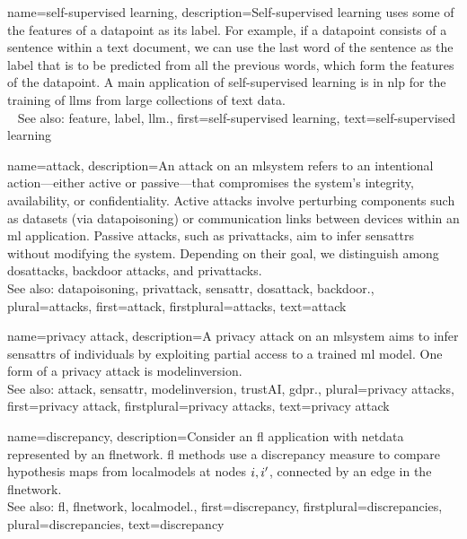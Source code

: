 {name={self-supervised learning},
 	description={Self-supervised learning uses some of 
  		the \glspl{feature} of a \gls{datapoint} as its \gls{label}. For 
		example, if a \gls{datapoint} consists of a sentence within a text document, 
		we can use the last word of the sentence as the \gls{label} that is 
		to be predicted from all the previous words, which form the \glspl{feature} 
		of the \gls{datapoint}. A main application of self-supervised learning 
		is in \gls{nlp} for the \gls{training} of \glspl{llm} from large collections 
		of text \gls{data}. 
		\\ 
      		See also: \gls{feature}, \gls{label}, \gls{llm}.}, 
   	first={self-supervised learning}, 
   	text={self-supervised learning}
}

{name={attack},  
	description={An attack on an \gls{mlsystem} refers to an intentional \gls{action}—either 
		active or passive—that compromises the system's integrity, availability, or confidentiality. 
		Active attacks involve perturbing components such as \glspl{dataset} (via \gls{datapoisoning}) 
		or communication links between \glspl{device} within an \gls{ml} application. Passive attacks, 
		such as \glspl{privattack}, aim to infer \glspl{sensattr} without modifying the system. 
		Depending on their goal, we distinguish among \glspl{dosattack}, \gls{backdoor} attacks, and \glspl{privattack}.
		\\
		See also: \gls{datapoisoning}, \gls{privattack}, \gls{sensattr}, \gls{dosattack}, \gls{backdoor}.},
	plural={attacks}, 
	first={attack},
	firstplural={attacks},
	text={attack}
}

{name={privacy attack},
	description={A privacy \gls{attack} on an \gls{mlsystem} aims to infer 
		\glspl{sensattr} of individuals by exploiting partial access to a trained \gls{ml} \gls{model}. 
		One form of a privacy \gls{attack} is \gls{modelinversion}.
		\\
		See also: \gls{attack}, \gls{sensattr}, \gls{modelinversion}, \gls{trustAI}, \gls{gdpr}.},
	plural={privacy attacks}, 
	first={privacy attack},
	firstplural={privacy attacks}, 
	text={privacy attack}
}

{name={discrepancy},
	description={Consider an \gls{fl} application with \gls{netdata} 
		represented by an \gls{flnetwork}. \gls{fl} methods use a discrepancy \gls{measure} 
		to compare \gls{hypothesis} \glspl{map} from \glspl{localmodel} at nodes $i,i'$, 
		\gls{connected} by an edge in the \gls{flnetwork}.
					\\ 
		See also: \gls{fl}, \gls{flnetwork}, \gls{localmodel}.},
	first={discrepancy},
	firstplural={discrepancies}, 
  	plural={discrepancies}, 
	text={discrepancy}
}


